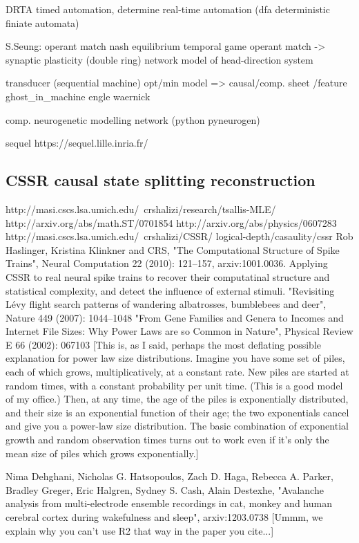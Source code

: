 \documentclass[12pt]{article}
\begin{document}
DRTA timed automation, determine real-time automation (dfa deterministic finiate automata)

S.Seung: operant match nash equilibrium temporal game
         operant match -> synaptic plasticity
         (double ring) network model of head-direction system

transducer (sequential machine) opt/min model => causal/comp. sheet
/feature
ghost_in_machine engle waernick

comp. neurogenetic modelling network (python pyneurogen)

sequel https://sequel.lille.inria.fr/

\subsection{CSSR causal state splitting reconstruction}
http://masi.cscs.lsa.umich.edu/~crshalizi/research/tsallis-MLE/
http://arxiv.org/abs/math.ST/0701854
http://arxiv.org/abs/physics/0607283
http://masi.cscs.lsa.umich.edu/~crshalizi/CSSR/
logical-depth/casaulity/cssr
Rob Haslinger, Kristina Klinkner and CRS, "The Computational Structure of Spike Trains", Neural Computation 22 (2010): 121--157, arxiv:1001.0036. Applying CSSR to real neural spike trains to recover their computatinal structure and statistical complexity, and detect the influence of external stimuli.
"Revisiting Lévy flight search patterns of wandering albatrosses, bumblebees
and deer", Nature 449 (2007): 1044--1048
"From Gene Families and Genera to Incomes and Internet File Sizes: Why Power Laws are so Common in Nature", Physical Review E 66 (2002): 067103 [This is, as I said, perhaps the most deflating possible explanation for power law size distributions. Imagine you have some set of piles, each of which grows, multiplicatively, at a constant rate. New piles are started at random times, with a constant probability per unit time. (This is a good model of my office.) Then, at any time, the age of the piles is exponentially distributed, and their size is an exponential function of their age; the two exponentials cancel and give you a power-law size distribution. The basic combination of exponential growth and random observation times turns out to work even if it's only the mean size of piles which grows exponentially.]

Nima Dehghani, Nicholas G. Hatsopoulos, Zach D. Haga, Rebecca A. Parker, Bradley Greger, Eric Halgren, Sydney S. Cash, Alain Destexhe, "Avalanche analysis from multi-electrode ensemble recordings in cat, monkey and human cerebral cortex during wakefulness and sleep", arxiv:1203.0738 [Ummm, we explain why you can't use R2 that way in the paper you cite...]
\end{document}
